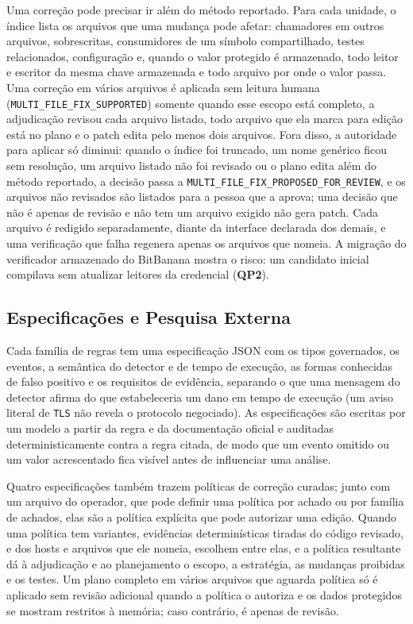 \documentclass[conference]{IEEEtran}
\newcommand{\researchq}[1]{\textbf{QP#1}}
\begin{document}
Uma correção pode precisar ir além do método reportado. Para cada unidade, o
índice lista os arquivos que uma mudança pode afetar: chamadores em outros
arquivos, sobrescritas, consumidores de um símbolo compartilhado, testes
relacionados, configuração e, quando o valor protegido é armazenado, todo leitor
e escritor da mesma chave armazenada e todo arquivo por onde o valor passa. Uma
correção em vários arquivos é aplicada sem leitura humana
(\texttt{MULTI\_FILE\_FIX\_SUPPORTED}) somente quando esse escopo está completo,
a adjudicação revisou cada arquivo listado, todo arquivo que ela marca para
edição está no plano e o patch edita pelo menos dois arquivos. Fora disso, a
autoridade para aplicar só diminui: quando o índice foi truncado, um nome genérico ficou sem
resolução, um arquivo listado não foi revisado ou o plano edita além do método
reportado, a decisão passa a
\texttt{MULTI\_FILE\_FIX\_}\allowbreak\texttt{PROPOSED\_FOR\_REVIEW}, e os
arquivos não revisados são listados para a pessoa que a aprova; uma decisão que
não é apenas de revisão e não tem um arquivo exigido não gera patch. Cada
arquivo é redigido separadamente, diante da interface declarada dos demais, e
uma verificação que falha regenera apenas os arquivos que nomeia. A migração do
verificador armazenado do BitBanana mostra o risco: um candidato inicial
compilava sem atualizar leitores da credencial (\researchq{2}).

\subsection{Especificações e Pesquisa Externa}

Cada família de regras tem uma especificação JSON com os tipos governados, os
eventos, a semântica do detector e de tempo de execução, as formas conhecidas
de falso positivo e os requisitos de evidência, separando o que uma mensagem do
detector afirma do que estabeleceria um dano em tempo de execução (um aviso
literal de \texttt{TLS} não revela o protocolo negociado). As especificações
são escritas por um modelo a partir da regra e da documentação oficial e
auditadas deterministicamente contra a regra citada, de modo que um evento
omitido ou um valor acrescentado fica visível antes de influenciar uma análise.

Quatro especificações também trazem políticas de correção curadas; junto com
um arquivo do operador, que pode definir uma política por achado ou por família
de achados, elas são a política explícita que pode autorizar uma edição. Quando
uma política tem variantes, evidências determinísticas tiradas do código
revisado, e dos hosts e arquivos que ele nomeia, escolhem entre elas, e a
política resultante dá à adjudicação e ao planejamento o escopo, a estratégia,
as mudanças proibidas e os testes. Um plano completo em vários arquivos que
aguarda política só é aplicado sem revisão adicional quando a política o
autoriza e os dados protegidos se mostram restritos à memória; caso contrário,
é apenas de revisão.
\end{document}
